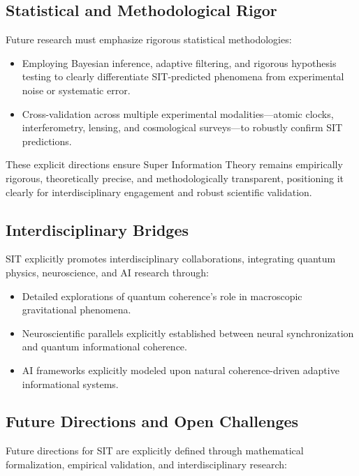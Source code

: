 \subsection{Statistical and Methodological Rigor}

Future research must emphasize rigorous statistical methodologies:
\begin{itemize}
    \item Employing Bayesian inference, adaptive filtering, and rigorous hypothesis testing to clearly differentiate SIT-predicted phenomena from experimental noise or systematic error.
    \item Cross-validation across multiple experimental modalities---atomic clocks, interferometry, lensing, and cosmological surveys---to robustly confirm SIT predictions.
\end{itemize}

These explicit directions ensure Super Information Theory remains empirically rigorous, theoretically precise, and methodologically transparent, positioning it clearly for interdisciplinary engagement and robust scientific validation.

\subsection{Interdisciplinary Bridges}

SIT explicitly promotes interdisciplinary collaborations, integrating quantum physics, neuroscience, and AI research through:

\begin{itemize}
\item Detailed explorations of quantum coherence's role in macroscopic gravitational phenomena.
\item Neuroscientific parallels explicitly established between neural synchronization and quantum informational coherence.
\item AI frameworks explicitly modeled upon natural coherence-driven adaptive informational systems.
\end{itemize}

\subsection{Future Directions and Open Challenges}

Future directions for SIT are explicitly defined through mathematical formalization, empirical validation, and interdisciplinary research:

